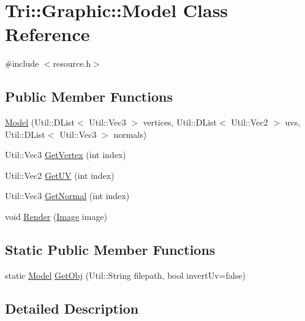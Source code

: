 \hypertarget{class_tri_1_1_graphic_1_1_model}{}\section{Tri\+:\+:Graphic\+:\+:Model Class Reference}
\label{class_tri_1_1_graphic_1_1_model}


{\ttfamily \#include $<$resource.\+h$>$}

\subsection*{Public Member Functions}
\begin{DoxyCompactItemize}
\item 
\hyperlink{class_tri_1_1_graphic_1_1_model_a57f8abc051d104b925e6a2cbb253b56c}{Model} (Util\+::\+D\+List$<$ Util\+::\+Vec3 $>$ vertices, Util\+::\+D\+List$<$ Util\+::\+Vec2 $>$ uvs, Util\+::\+D\+List$<$ Util\+::\+Vec3 $>$ normals)
\item 
Util\+::\+Vec3 \hyperlink{class_tri_1_1_graphic_1_1_model_af64f04fc0559ceb51061f8dfed0eb4e6}{Get\+Vertex} (int index)
\item 
Util\+::\+Vec2 \hyperlink{class_tri_1_1_graphic_1_1_model_a64da67596d9650b41ce0dd60f90eb7bb}{Get\+U\+V} (int index)
\item 
Util\+::\+Vec3 \hyperlink{class_tri_1_1_graphic_1_1_model_a086a31e07b32371a5d7d6c4629853cb9}{Get\+Normal} (int index)
\item 
void \hyperlink{class_tri_1_1_graphic_1_1_model_aa190ca9e2258a28ea12a36d7fb25b0de}{Render} (\hyperlink{class_tri_1_1_graphic_1_1_image}{Image} image)
\end{DoxyCompactItemize}
\subsection*{Static Public Member Functions}
\begin{DoxyCompactItemize}
\item 
static \hyperlink{class_tri_1_1_graphic_1_1_model}{Model} \hyperlink{class_tri_1_1_graphic_1_1_model_a779169e267e557ef11f86d561eecd8b2}{Get\+Obj} (Util\+::\+String filepath, bool invert\+Uv=false)
\end{DoxyCompactItemize}


\subsection{Detailed Description}


